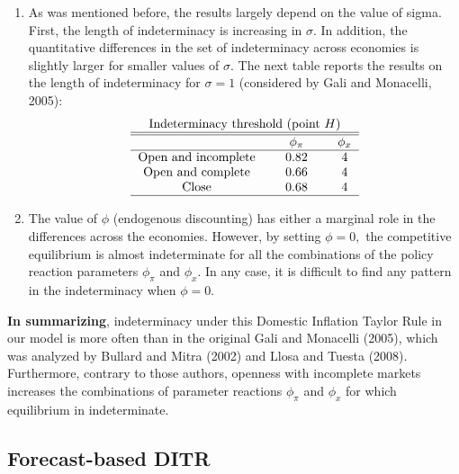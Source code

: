 \documentclass{article}
\begin{document}
\begin{enumerate}
\item As was mentioned before, the results largely depend on the value of
sigma. First, the length of indeterminacy is increasing in $\sigma .$ In
addition, the quantitative differences in the set of indeterminacy across
economies is slightly larger for smaller values of $\sigma .$ The next table
reports the results on the length of indeterminacy for $\sigma =1$
(considered by Gali and Monacelli, 2005):%
\begin{equation*}
\begin{tabular}{lcccc}
\multicolumn{5}{c}{Indeterminacy threshold (point $H)$} \\ \hline\hline
&  & $\phi _{\pi }$ &  & $\phi _{x}$ \\ \hline
\multicolumn{1}{c}{Open and incomplete} &  & $0.82$ &  & $4$ \\ 
\multicolumn{1}{c}{Open and complete} &  & $0.66$ &  & $4$ \\ 
\multicolumn{1}{c}{Close} &  & $0.68$ &  & $4$ \\ \hline
\end{tabular}%
\end{equation*}

\item The value of $\phi $ (endogenous discounting) has either a marginal
role in the differences across the economies. However, by setting $\phi =0,$
the competitive equilibrium is almost indeterminate for all the combinations
of the policy reaction parameters $\phi _{\pi }$ and $\phi _{x}.$ In any
case, it is difficult to find any pattern in the indeterminacy when $\phi
=0. $
\end{enumerate}

\textbf{In summarizing}, indeterminacy under this Domestic Inflation Taylor
Rule in our model is more often than in the original Gali and Monacelli
(2005), which was analyzed by Bullard and Mitra (2002) and Llosa and Tuesta
(2008). Furthermore, contrary to those authors, openness with incomplete
markets increases the combinations of parameter reactions $\phi _{\pi }$ and 
$\phi _{x}$ for which equilibrium in indeterminate.

\subsection{Forecast-based DITR}
\end{document}
